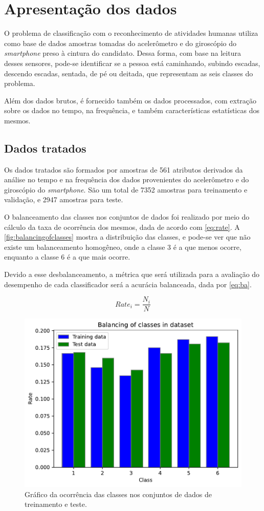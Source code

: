 
\section{Apresentação dos dados}

O problema de classificação com o reconhecimento de atividades humanas utiliza como base de dados amostras tomadas do acelerômetro e do giroscópio do \textit{smartphone} preso à cintura do candidato. Dessa forma, com base na leitura desses sensores, pode-se identificar se a pessoa está caminhando, subindo escadas, descendo escadas, sentada, de pé ou deitada, que representam as seis classes do problema.

Além dos dados brutos, é fornecido também os dados processados, com extração sobre os dados no tempo, na frequência, e também características estatísticas dos mesmos.

\subsection{Dados tratados}

Os dados tratados são formados por amostras de 561 atributos derivados da análise no tempo e na frequência dos dados provenientes do acelerômetro e do giroscópio do \textit{smartphone}. São um total de 7352 amostras para treinamento e validação, e 2947 amostras para teste.

O balanceamento das classes nos conjuntos de dados foi realizado por meio do cálculo da taxa de ocorrência dos mesmos, dada de acordo com \eqref{eq:rate}. A \autoref{fig:balancingofclasses} mostra a distribuição das classes, e pode-se ver que não existe um balanceamento homogêneo, onde a classe 3 é a que menos ocorre, enquanto a classe  6 é a que mais ocorre.

Devido a esse desbalanceamento, a métrica que será utilizada para a avaliação do desempenho de cada classificador será a acurácia balanceada, dada por \eqref{eq:ba}.

\begin{equation}\label{eq:rate}
	Rate_i = \frac{N_i}{N}
\end{equation}

\begin{figure}[H]
	\centering
	\includegraphics[width=0.6\linewidth]{../../plot/Balancing_of_classes}
	\caption{Gráfico da ocorrência das classes nos conjuntos de dados de treinamento e teste.}
	\label{fig:balancingofclasses}
\end{figure}


